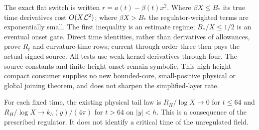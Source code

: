 The exact flat switch is written $r=a(t)-\beta(t)x^2$.
Where $\beta X\le B_*$ its true time derivatives cost
$O(X\mathcal L^2)$; where $\beta X>B_*$ the regulator-weighted terms are
exponentially small. The first inequality is an estimate regime;
$B_*/X\le1/2$ is an eventual onset gate. Direct time identities,
rather than derivatives of allowances, prove $R_t$ and curvature-time
rows; current through order three then pays the actual signed source.
All tests use weak kernel derivatives through four. The source constants
and finite height onset remain symbolic. This high-height compact
consumer supplies no new bounded-core, small-positive physical or global
joining theorem, and does not sharpen the simplified-layer rate.

For each fixed time, the existing physical tail law is
$R_H/\log X\to0$ for $t\le64$ and $R_H/\log X\to k_h(y)/(4\pi)$
for $t>64$ on $|y|<h$. This is a consequence of the prescribed
regulator. It does not identify a critical time of the unregulated field.

